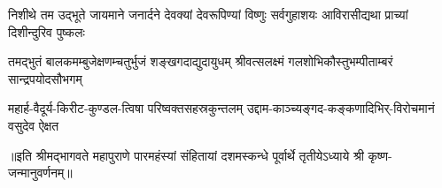 
\addtocounter{shlokacount}{7}
\threelineshloka
{निशीथे तम उद्भूते जायमाने जनार्दने}
{देवक्यां देवरूपिण्यां विष्णुः सर्वगुहाशयः}
{आविरासीद्यथा प्राच्यां दिशीन्दुरिव पुष्कलः}

\fourlineindentedshloka
{तमद्भुतं बालकमम्बुजेक्षणम्}{चतुर्भुजं शङ्खगदाद्युदायुधम्}
{श्रीवत्सलक्ष्मं गलशोभिकौस्तुभम्}{पीताम्बरं सान्द्रपयोदसौभगम्}


\fourlineindentedshloka
{महार्ह-वैदूर्य-किरीट-कुण्डल-}{त्विषा परिष्वक्तसहस्रकुन्तलम्}
{उद्दाम-काञ्च्यङ्गद-कङ्कणादिभिर्-}{विरोचमानं वसुदेव ऐक्षत}

॥इति श्रीमद्भागवते महापुराणे पारमहंस्यां संहितायां दशमस्कन्धे पूर्वार्थे तृतीयेऽध्याये श्री कृष्ण-जन्मानुवर्णनम्॥
